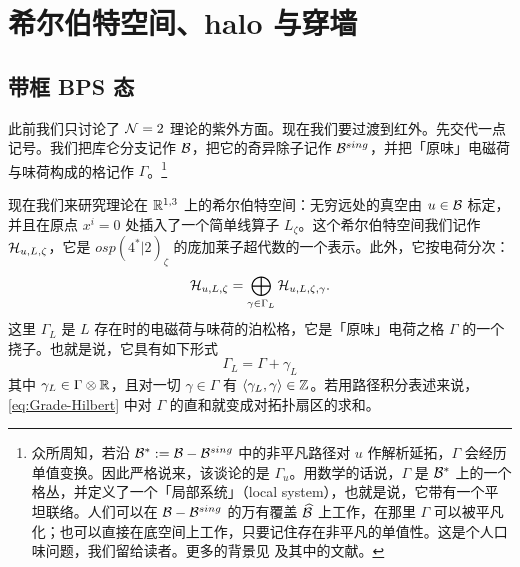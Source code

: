 
\section{希尔伯特空间、halo 与穿墙}
\label{sec:Hilbert-Halo-WC}

\subsection{带框 BPS 态}
\label{sec:framed-BPS-states}

此前我们只讨论了 $\mathcal{N}=2$ 理论的紫外方面。现在我们要过渡到红外。先交代一点记号。我们把库仑分支记作 $\mathcal{B}$，把它的奇异除子记作 $\mathcal{B}^{sing}$，并把「原味」电磁荷与味荷构成的格记作 $\Gamma$。\footnote{众所周知，若沿 $\mathcal{B}^*:=\mathcal{B}-\mathcal{B}^{sing}$ 中的非平凡路径对 $u$ 作解析延拓，$\Gamma$ 会经历单值变换。因此严格说来，该谈论的是 $\Gamma_u$。用数学的话说，$\Gamma$ 是 $\mathcal{B}^*$ 上的一个格丛，并定义了一个「局部系统」（local system），也就是说，它带有一个平坦联络。人们可以在 $\mathcal{B}-\mathcal{B}^{sing}$ 的万有覆盖 $\widehat{\mathcal{B}}$ 上工作，在那里 $\Gamma$ 可以被平凡化；也可以直接在底空间上工作，只要记住存在非平凡的单值性。这是个人口味问题，我们留给读者。更多的背景见 \cite{Gaiotto:2008cd,Gaiotto:2009hg} 及其中的文献。}

现在我们来研究理论在 $\mathbb{R}^{1,3}$ 上的希尔伯特空间：无穷远处的真空由 $u\in\mathcal{B}$ 标定，并且在原点 $x^i=0$ 处插入了一个简单线算子 $L_\zeta$。这个希尔伯特空间我们记作 $\mathcal{H}_{u,L,\zeta}$，它是 $osp(4^*\vert 2)_\zeta$ 的庞加莱子超代数的一个表示。此外，它按电荷分次：
\begin{equation}\label{eq:Grade-Hilbert}
\mathcal{H}_{u,L,\zeta} = \bigoplus_{\gamma \in \Gamma_L}
\mathcal{H}_{u,L,\zeta,\gamma}.
\end{equation}
这里 $\Gamma_L$ 是 $L$ 存在时的电磁荷与味荷的泊松格，它是「原味」电荷之格 $\Gamma$ 的一个挠子。也就是说，它具有如下形式
\begin{equation}\label{eq:Lattice-Shift}
\Gamma_L = \Gamma + \gamma_L
\end{equation}
其中 $\gamma_L \in \Gamma \otimes \mathbb{R}$，且对一切 $\gamma \in \Gamma$ 有 $\langle \gamma_L, \gamma\rangle \in \mathbb{Z}$。若用路径积分表述来说，\eqref{eq:Grade-Hilbert} 中对 $\Gamma$ 的直和就变成对拓扑扇区的求和。

